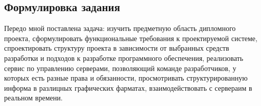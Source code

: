 \subsection{Формулировка задания}
Передо мной поставлена задача: изучить предметную область
дипломного проекта, сформулировать функциональные требования к 
проектируемой системе, спроектировать структуру проекта в зависимости от выбранных средств разработки и подходов к разработке программного обеспечения, реализовать сервис по управлению серверами, позволяющий команде разработчиков, у которых есть разные права и обязанности, просмотривать структурированную информа в разлицных графических фарматах, взаимодействовать с сервераим в реальном времени.
